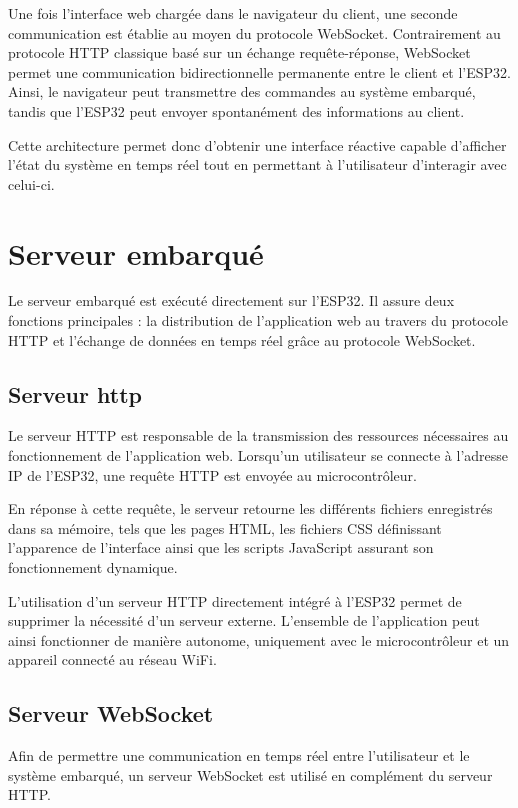 Une fois l'interface web chargée dans le navigateur du client, une seconde communication est établie au moyen du protocole WebSocket. Contrairement au protocole HTTP classique basé sur un échange requête-réponse, WebSocket permet une communication bidirectionnelle permanente entre le client et l'ESP32. Ainsi, le navigateur peut transmettre des commandes au système embarqué, tandis que l'ESP32 peut envoyer spontanément des informations au client.

Cette architecture permet donc d'obtenir une interface réactive capable d'afficher l'état du système en temps réel tout en permettant à l'utilisateur d'interagir avec celui-ci.

\section{Serveur embarqué}

Le serveur embarqué est exécuté directement sur l'ESP32. Il assure deux fonctions principales : la distribution de l'application web au travers du protocole HTTP et l'échange de données en temps réel grâce au protocole WebSocket.

\subsection{Serveur \acrshort{http}}

Le serveur HTTP est responsable de la transmission des ressources nécessaires au fonctionnement de l'application web. Lorsqu'un utilisateur se connecte à l'adresse IP de l'ESP32, une requête HTTP est envoyée au microcontrôleur.

En réponse à cette requête, le serveur retourne les différents fichiers enregistrés dans sa mémoire, tels que les pages HTML, les fichiers CSS définissant l'apparence de l'interface ainsi que les scripts JavaScript assurant son fonctionnement dynamique.

L'utilisation d'un serveur HTTP directement intégré à l'ESP32 permet de supprimer la nécessité d'un serveur externe. L'ensemble de l'application peut ainsi fonctionner de manière autonome, uniquement avec le microcontrôleur et un appareil connecté au réseau WiFi.

\subsection{Serveur WebSocket}

Afin de permettre une communication en temps réel entre l'utilisateur et le système embarqué, un serveur WebSocket est utilisé en complément du serveur HTTP.


